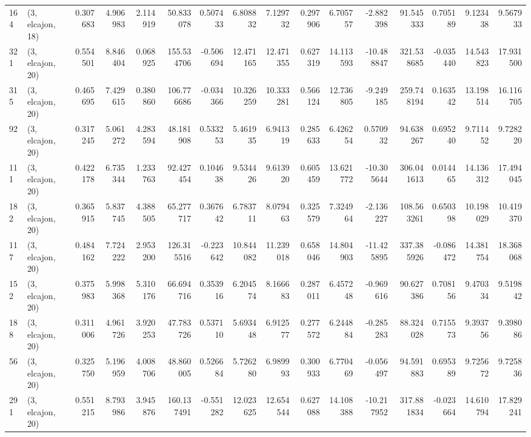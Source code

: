 \begin{tabular}{llrrrrrrrrrrrrrr}
164 &  (3, elcajon, 18) &   0.307683 &   4.906983 &   2.114919 &    50.833078 &   0.507433 &   6.808832 &   7.129732 &  0.297906 &   6.705757 &  -2.882398 &    91.545333 &  0.705189 &   9.123438 &   9.567933 \\
321 &  (3, elcajon, 20) &   0.554501 &   8.846404 &   0.068925 &   155.534706 &  -0.506694 &  12.471165 &  12.471355 &  0.627319 &  14.113593 & -10.488847 &   321.538685 & -0.035440 &  14.543823 &  17.931500 \\
315 &  (3, elcajon, 20) &   0.465695 &   7.429615 &   0.380860 &   106.776686 &  -0.034366 &  10.326259 &  10.333281 &  0.566124 &  12.736805 &  -9.249185 &   259.748194 &  0.163542 &  13.198514 &  16.116705 \\
92  &  (3, elcajon, 20) &   0.317245 &   5.061272 &   4.283594 &    48.181908 &   0.533253 &   5.461935 &   6.941319 &  0.285633 &   6.426254 &   0.570932 &    94.638267 &  0.695240 &   9.711452 &   9.728220 \\
111 &  (3, elcajon, 20) &   0.422178 &   6.735344 &   1.233763 &    92.427454 &   0.104638 &   9.534426 &   9.613920 &  0.605459 &  13.621772 & -10.305644 &   306.041613 &  0.014465 &  14.136312 &  17.494045 \\
182 &  (3, elcajon, 20) &   0.365915 &   5.837745 &   4.388505 &    65.277717 &   0.367642 &   6.783711 &   8.079463 &  0.325579 &   7.324964 &  -2.136227 &   108.563261 &  0.650398 &  10.198029 &  10.419370 \\
117 &  (3, elcajon, 20) &   0.484162 &   7.724222 &   2.953200 &   126.315516 &  -0.223642 &  10.844082 &  11.239018 &  0.658046 &  14.804903 & -11.425895 &   337.385926 & -0.086472 &  14.381754 &  18.368068 \\
152 &  (3, elcajon, 20) &   0.375983 &   5.998368 &   5.310176 &    66.694716 &   0.353916 &   6.204574 &   8.166683 &  0.287011 &   6.457248 &  -0.969616 &    90.627386 &  0.708156 &   9.470334 &   9.519842 \\
188 &  (3, elcajon, 20) &   0.311006 &   4.961726 &   3.920253 &    47.783726 &   0.537110 &   5.693448 &   6.912577 &  0.277572 &   6.244884 &  -0.285283 &    88.324028 &  0.715573 &   9.393756 &   9.398086 \\
56  &  (3, elcajon, 20) &   0.325750 &   5.196959 &   4.008706 &    48.860005 &   0.526684 &   5.726280 &   6.989993 &  0.300933 &   6.770469 &  -0.056497 &    94.591883 &  0.695389 &   9.725672 &   9.725836 \\
291 &  (3, elcajon, 20) &   0.551215 &   8.793986 &   3.945876 &   160.137491 &  -0.551282 &  12.023625 &  12.654544 &  0.627088 &  14.108388 & -10.217952 &   317.881834 & -0.023664 &  14.610794 &  17.829241 \\

\end{tabular}

